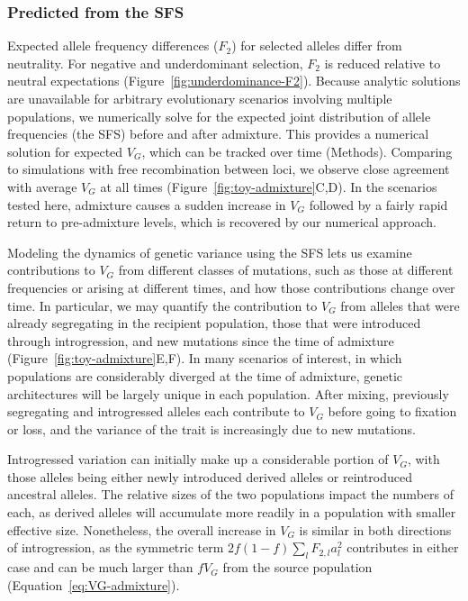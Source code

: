 \documentclass{article}
\begin{document}
\subsubsection*{Predicted  from the SFS}

Expected allele frequency differences ($F_2$) for selected alleles differ from
neutrality. For negative and underdominant selection, $F_2$ is reduced relative
to neutral expectations (Figure~\ref{fig:underdominance-F2}). Because analytic
solutions are unavailable for arbitrary evolutionary scenarios involving
multiple populations, we numerically solve for the expected joint distribution
of allele frequencies (the SFS) before and after admixture. This provides a
numerical solution for expected $V_G$, which can be tracked over time
(Methods). Comparing to simulations with free recombination between loci, we
observe close agreement with average $V_G$ at all times
(Figure~\ref{fig:toy-admixture}C,D). In the scenarios tested here, admixture
causes a sudden increase in $V_G$ followed by a fairly rapid return to
pre-admixture levels, which is recovered by our numerical approach.

Modeling the dynamics of genetic variance using the SFS lets us examine
contributions to $V_G$ from different classes of mutations, such as those at
different frequencies or arising at different times, and how those
contributions change over time. In particular, we may quantify the contribution
to $V_G$ from alleles that were already segregating in the recipient
population, those that were introduced through introgression, and new mutations
since the time of admixture (Figure~\ref{fig:toy-admixture}E,F). In many
scenarios of interest, in which populations are considerably diverged at the
time of admixture, genetic architectures will be largely unique in each
population. After mixing, previously segregating and introgressed alleles each
contribute to $V_G$ before going to fixation or loss, and the variance of the
trait is increasingly due to new mutations. 

Introgressed variation can initially make up a considerable portion of $V_G$,
with those alleles being either newly introduced derived alleles or
reintroduced ancestral alleles. The relative sizes of the two populations
impact the numbers of each, as derived alleles will accumulate more readily in
a population with smaller effective size. Nonetheless, the overall increase in
$V_G$ is similar in both directions of introgression, as the symmetric term
\(2f(1-f)\sum_l F_{2,l} a_l^2\) contributes in either case and can be much
larger than $f V_G$ from the source population
(Equation~\ref{eq:VG-admixture}).
\end{document}
